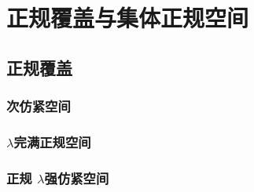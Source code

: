 \documentclass[main.tex]{subfiles}
\begin{document}
	
\part{正规覆盖与集体正规空间}\label{part3}

\chapter{正规覆盖}\label{ch7}
	
	\section{次仿紧空间}\label{sec:4.1}
	
	
	\section{$\lambda$完满正规空间}\label{sec:4.2}
	
	
	\section{正规	$\lambda$强仿紧空间}\label{sec:4.3}
	
\end{document}
